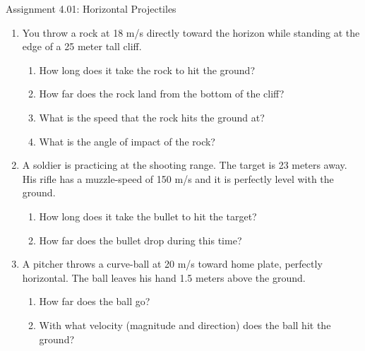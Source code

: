 \documentclass[letterpaper, 12pt]{article}
\begin{document}


\begin{center} Assignment 4.01: Horizontal Projectiles
\end{center}





\begin{enumerate}

\item You throw a rock at 18 m/s directly toward the horizon while standing at the edge of a 25 meter tall cliff.  
\begin{enumerate}
	\item How long does it take the rock to hit the ground?
	\vspace{0.55in}
	\item How far does the rock land from the bottom of the cliff?
	\vspace{0.55in}
	\item What is the speed that the rock hits the ground at?	
	\vspace{0.55in}
	\item What is the angle of impact of the rock?
	\vspace{0.55in}
\end{enumerate}

\item A soldier is practicing at the shooting range. The target is 23 meters away.  His rifle has a muzzle-speed of 150 m/s and it is perfectly level with the ground.
\begin{enumerate}
	\item How long does it take the bullet to hit the target?
	\vspace{0.5in}
	\item How far does the bullet drop during this time?
	\vspace{0.5in}
\end{enumerate}

\item  A pitcher throws a curve-ball at 20 m/s toward home plate, perfectly horizontal.  The ball leaves his hand 1.5 meters above the ground.  
\begin{enumerate}
	\item How far does the ball go?
	\vspace{0.5in}
	\item With what velocity (magnitude and direction) does the ball hit the ground?
	\vspace{0.7in}
\end{enumerate}



\end{enumerate}
\end{document}
